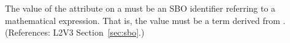 The value of the  attribute on a \Trigger must be an SBO
identifier referring to a mathematical expression.  That is, the value
must be a term derived from \sbomathformula.  (References: 
L2V3 Section~\ref{sec:sbo}.)
